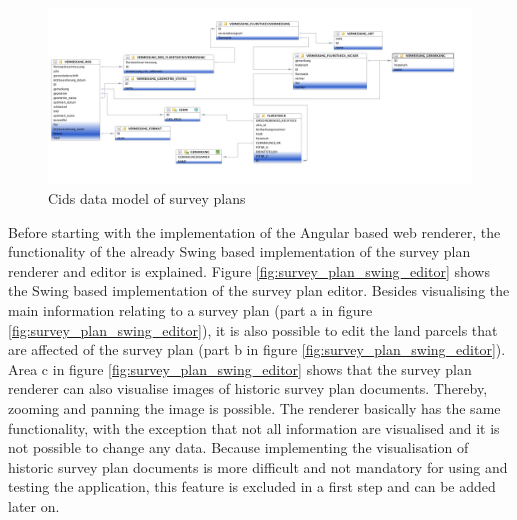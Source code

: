 \begin{figure}
	\centering	\includegraphics[width=1.0\textwidth]{./img/impl/surveyPlan_data_model.png}
	\caption{Cids data model of survey plans}
	\label{fig:survey_plan_data_model}
\end{figure}

Before starting with the implementation of the Angular based web renderer, the functionality of the already Swing based implementation of the survey plan renderer and editor is explained.
Figure \ref{fig:survey_plan_swing_editor} shows the Swing based implementation of the survey plan editor.
Besides visualising the main information relating to a survey plan (part a in figure \ref{fig:survey_plan_swing_editor}),  it is also possible to edit the land parcels that are affected of the survey plan (part b in figure \ref{fig:survey_plan_swing_editor}).
Area c in figure \ref{fig:survey_plan_swing_editor} shows that the survey plan renderer can also visualise images of historic survey plan documents.
Thereby, zooming and panning the image is possible.
The renderer basically has the same functionality, with the exception that not all information are visualised and it is not possible to change any data.
Because implementing the visualisation of historic survey plan documents is more difficult and not mandatory for using and testing the application, this feature is excluded in a first step and can be added later on.

